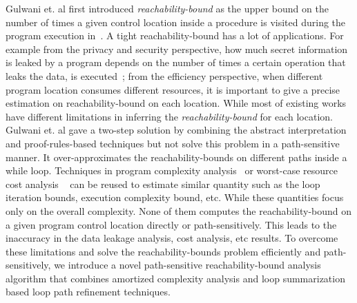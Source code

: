 Gulwani et. al first introduced \emph{reachability-bound} as the upper bound on the number of times a given control location 
inside a procedure is visited during the program execution in~\cite{GulwaniZ10}.
A tight reachability-bound has a lot of applications.
For example from the privacy and security perspective,
how much secret information is leaked by a program depends on the number of times a certain operation that leaks the data,
is executed~\cite{Malacaria07};
from the efficiency perspective, when different program location consumes different resources, it is important to give a precise estimation on reachability-bound on each location.
While most of existing works have different limitations in inferring the \emph{reachability-bound} for each location.
Gulwani et. al
gave a two-step solution by combining the abstract interpretation and proof-rules-based techniques but not solve this problem in a path-sensitive manner.
It over-approximates the reachability-bounds on different paths inside a while loop.
Techniques in program complexity analysis~\cite{GustafssonEL05,HumenbergerJK18} 
or worst-case resource cost analysis
~\cite{BrockschmidtEFFG16,AlbertAGP08,AliasDFG10,Flores-MontoyaH14} can be reused to estimate similar quantity such as the
loop iteration bounds, execution complexity bound, etc.
While these quantities focus only on  
the overall complexity.
None of them computes the reachability-bound on a given program control location directly or path-sensitively.
This leads to the inaccuracy in the data leakage analysis, cost analysis, etc results.
To overcome these limitations and solve 
the reachability-bounds problem efficiently and path-sensitively, 
we introduce a novel path-sensitive reachability-bound analysis algorithm that combines amortized complexity analysis and loop summarization based loop path refinement techniques. 

